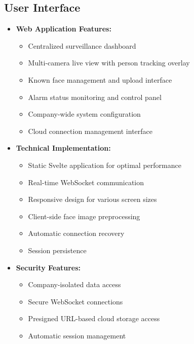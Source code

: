 \documentclass[conference]{IEEEtran}
\begin{document}
\subsection{User Interface}
\begin{itemize}
      \item \textbf{Web Application Features:}
            \begin{itemize}
                  \item Centralized surveillance dashboard
                  \item Multi-camera live view with person tracking overlay
                  \item Known face management and upload interface
                  \item Alarm status monitoring and control panel
                  \item Company-wide system configuration
                  \item Cloud connection management interface
            \end{itemize}

      \item \textbf{Technical Implementation:}
            \begin{itemize}
                  \item Static Svelte application for optimal performance
                  \item Real-time WebSocket communication
                  \item Responsive design for various screen sizes
                  \item Client-side face image preprocessing
                  \item Automatic connection recovery
                  \item Session persistence
            \end{itemize}

      \item \textbf{Security Features:}
            \begin{itemize}
                  \item Company-isolated data access
                  \item Secure WebSocket connections
                  \item Presigned URL-based cloud storage access
                  \item Automatic session management
            \end{itemize}
\end{itemize}
\end{document}
